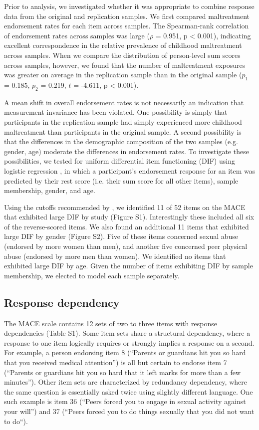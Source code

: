 \documentclass[letterpaper,man,natbib]{apa6}  %
\begin{document}
Prior to analysis, we investigated whether it was appropriate to combine response data from the original and replication samples. We first compared maltreatment endorsement rates for each item across samples. The Spearman-rank correlation of endorsement rates across samples was large ($\rho$ = 0.951, p < 0.001), indicating excellent correspondence in the relative prevalence of childhood maltreatment across samples. When we compare the distribution of person-level sum scores across samples,  however, we found that the number of maltreatment exposures was greater on average in the replication sample than in the original sample ($p_1$ = 0.185, $p_2$ = 0.219, $t$ = -4.611, p < 0.001). 

A mean shift in overall endorsement rates is not necessarily an indication that measurement invariance has been violated. One possibility is simply that participants in the replication sample had simply experienced more childhood maltreatment than participants in the original sample. A second possibility is that the differences in the demographic composition of the two samples (e.g. gender, age) moderate the differences in endorsement rates. To investigate these possibilities, we tested for uniform differential item functioning (DIF) using logistic regression \citep{rogers1993comparison}, in which a participant's endorsement response for an item was predicted by their rest score (i.e. their sum score for all other items), sample membership, gender, and age. 

Using the cutoffs recommended by \cite{hidalgo2014binary}, we identified 11 of 52 items on the MACE that exhibited large DIF by study (Figure S1). Interestingly these included all six of the reverse-scored items. We also found an additional 11 items that exhibited large DIF by gender (Figure S2). Five of these items concerned sexual abuse (endorsed by more women than men), and another five concerned peer physical abuse (endorsed by more men than women). We identified no items that exhibited large DIF by age. Given the number of items exhibiting DIF by sample membership, we elected to model each sample separately.

\subsection{Response dependency}

The MACE scale contains 12 sets of two to three items with response dependencies (Table S1). Some item sets share a structural dependency, where a response to one item logically requires or strongly implies a response on a second. For example, a person endorsing item 8 (``Parents or guardians hit you so hard that you received medical attention'') is all but certain to endorse item 7 (``Parents or guardians hit you so hard that it left marks for more than a few minutes''). Other item sets are characterized by redundancy dependency, where the same question is essentially asked twice using slightly different language. One such example is item 36 (``Peers forced you to engage in sexual activity against your will'') and 37 (``Peers forced you to do things sexually that you did not want to do``). 
\end{document}
